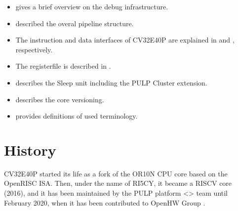 \documentclass[letterpaper,10pt,english]{sphinxmanual}
\begin{document}
\begin{itemize}
\item {} 
\sphinxAtStartPar
{\hyperref[\detokenize{debug:debug-support}]{}} gives a brief overview on the debug infrastructure.

\item {} 
\sphinxAtStartPar
{\hyperref[\detokenize{pipeline:pipeline-details}]{}} described the overal pipeline structure.

\item {} 
\sphinxAtStartPar
The instruction and data interfaces of CV32E40P are explained in {\hyperref[\detokenize{instruction_fetch:instruction-fetch}]{}} and {\hyperref[\detokenize{load_store_unit:load-store-unit}]{}}, respectively.

\item {} 
\sphinxAtStartPar
The register\sphinxhyphen{}file is described in {\hyperref[\detokenize{register_file:register-file}]{}}.

\item {} 
\sphinxAtStartPar
{\hyperref[\detokenize{sleep:sleep-unit}]{}} describes the Sleep unit including the PULP Cluster extension.

\item {} 
\sphinxAtStartPar
{\hyperref[\detokenize{core_versions:core-versions}]{}} describes the core versioning.

\item {} 
\sphinxAtStartPar
{\hyperref[\detokenize{glossary:glossary}]{}} provides definitions of used terminology.

\end{itemize}


\section{History}
\label{\detokenize{intro:history}}
\sphinxAtStartPar
CV32E40P started its life as a fork of the OR10N CPU core based on the OpenRISC ISA. Then, under the name of RI5CY, it became a RISC\sphinxhyphen{}V core (2016),
and it has been maintained by the PULP platform \textless{}\textgreater{} team until February 2020, when it has been contributed to OpenHW Group .
\end{document}
